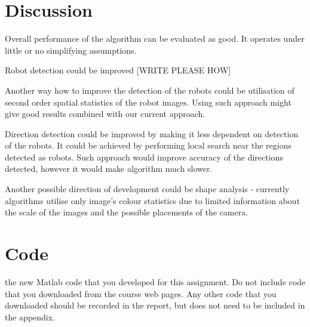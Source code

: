 \documentclass[10pt,a4paper,twocolumn]{article}
\begin{document}
\section{Discussion}
Overall performance of the algorithm can be evaluated as good. It operates under little or no simplifying assumptions.

Robot detection could be improved [WRITE PLEASE HOW]

Another way how to improve the detection of the robots could be utilisation of second order spatial statistics of the robot images. Using such approach might give good results combined with our current approach.

Direction detection could be improved by making it less dependent on detection of the robots. It could be achieved by performing local search near the regions detected as robots. Such approach would improve accuracy of the directions detected, however it would make algorithm much slower. 

Another possible direction of development could be shape analysis - currently algorithms utilise only image's colour statistics due to limited information about the scale of the images and the possible placements of the camera. 
\section{Code}
the new Matlab code that you developed for this assignment. Do not
include code that you downloaded from the course web pages. Any other code
that you downloaded should be recorded in the report, but does not need to
be included in the appendix.
\end{document}
